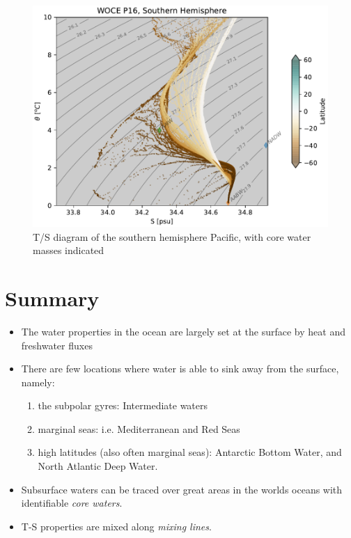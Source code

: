 \begin{figure}[htp]
  \centering
  \includegraphics{figs/WaterMasses/P16TSSouthern}
      \caption{T/S diagram of the southern hemisphere Pacific, with core water masses indicated}
    \label{fig:P16TSSouthern}  
\end{figure}

\section{Summary}

\begin{itemize}
    \item The water properties in the ocean are largely set at the surface by heat and freshwater fluxes
    \item There are few locations where water is able to sink away from the surface, namely:
        \begin{enumerate}
            \item the subpolar gyres: Intermediate waters
            \item marginal seas: i.e. Mediterranean and Red Seas
            \item high latitudes (also often marginal seas): Antarctic Bottom Water, and North Atlantic Deep Water.
        \end{enumerate}
    \item Subsurface waters can be traced over great areas in the worlds oceans with identifiable \emph{core waters}.
    \item T-S properties are mixed along \emph{mixing lines}. 
\end{itemize}

